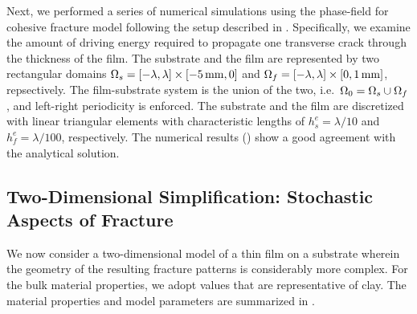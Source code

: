 Next, we performed a series of numerical simulations using the phase-field for cohesive fracture model following the setup described in .  Specifically, we examine the amount of driving energy required to propagate one transverse crack through the thickness of the film. The substrate and the film are represented by two rectangular domains $\Omega_s = [-\lambda,\lambda] \times [\SI{-5}{\milli\meter},0]$
and $\Omega_f = [-\lambda,\lambda] \times [0,\SI{1}{\milli\meter}]$, repsectively. The film-substrate system is the union of the two, i.e.\ $\Omega_0 = \Omega_s \cup \Omega_f$, and left-right periodicity is enforced. The substrate and the film are discretized with linear triangular elements with characteristic lengths of $h^e_s = \lambda/10$ and $h^e_f = \lambda/100$, respectively.
The numerical results () show a good agreement with the analytical solution.

\subsection{Two-Dimensional Simplification: Stochastic Aspects of Fracture}
\label{section: Chapter4/examples/2D}

We now consider a two-dimensional model of a thin film on a substrate wherein the geometry of the resulting fracture patterns is considerably more complex.  For the bulk material properties, we adopt values that are representative of clay. The material properties and model parameters are summarized in .

